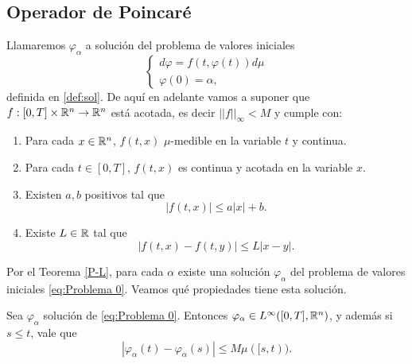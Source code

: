  	
 	
 	
 	




 \subsection{Operador de Poincaré} 
Llamaremos $\varphi_\alpha$ a solución  del problema de valores iniciales
 \begin{equation}
 	\left\lbrace \begin{array}{l}
 		d\varphi=f(t,\varphi(t))d\mu\\
 		\varphi(0)=\alpha,
 	\end{array}\right. \label{eq:Problema 0}
 \end{equation}
definida en \ref{def:sol}. De aquí  en adelante vamos a suponer que  $f:[0,T]\times\mathbb{R}^n\to\mathbb{R}^n$ está acotada, es decir $||f||_\infty<M$ y cumple con:
 \begin{enumerate}[label=\upshape(P-\arabic*),ref= (P-\arabic*)]
 	\item \label{pm1} Para cada $x\in\mathbb{R}^n$, $f(t,x)$  $\mu$-medible en la variable $t$ y continua.
 	\item \label{pm2} Para cada $t\in[0,T]$, $f(t,x)$ es continua y acotada en la variable $x$.
 	\item \label{pm3} Existen $a,b$ positivos tal que
 	$$|f(t,x)|\leq a|x|+b.$$ 
 	\item \label{pm4}Existe $L\in\mathbb{R}$ tal que $$\left| f(t,x)-f(t,y)\right|\leq L\left| x-y \right| . $$
 \end{enumerate} 
 Por el Teorema \ref{P-L}, para cada $\alpha$ existe una solución $\varphi_\alpha$ del problema de valores iniciales \eqref{eq:Problema 0}. Veamos qué propiedades tiene esta solución.
\begin{prop}
     Sea $\varphi_\alpha$ solución de  \eqref{eq:Problema 0}. Entonces $\varphi_{\alpha}\in L^\infty([0,T],\mathbb{R}^n)$, y además si $s\leq t$, vale que
    \begin{equation*}\label{acotación}
        \left| \varphi_\alpha(t)-\varphi_\alpha(s)\right|\leq M\mu([s,t)).
    \end{equation*}
\end{prop}
